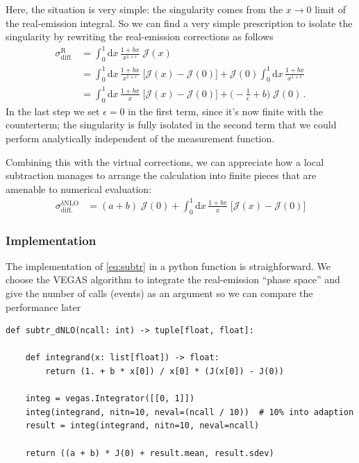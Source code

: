 \documentclass[11pt]{article}
\begin{document}
Here, the situation is very simple: the singularity comes from the \(x\to0\) limit of the real-emission integral.
So we can find a very simple prescription to isolate the singularity by rewriting the real-emission corrections as follows
\begin{align}
  \sigma^\mathrm{R}_\mathrm{diff.}
  &=
  \int_0^1\mathrm{d}x\,\frac{1+bx}{x^{1+\epsilon}}
  \;\mathcal{J}(x)
  \nonumber\\&=
  \int_0^1\mathrm{d}x\,\frac{1+bx}{x^{1+\epsilon}}
  \;\Big[\mathcal{J}(x) - \mathcal{J}(0)\Bigr]
  + \mathcal{J}(0)
  \int_0^1\mathrm{d}x\,\frac{1+bx}{x^{1+\epsilon}}
  \nonumber\\&=
  \int_0^1\mathrm{d}x\,\frac{1+bx}{x}
  \;\Big[\mathcal{J}(x) - \mathcal{J}(0)\bigr]
  +\biggl( -\frac{1}{\epsilon} + b \biggr) \;\mathcal{J}(0)
  \,.
\end{align}
In the last step we set \(\epsilon=0\) in the first term, since it's now finite with the counterterm; the singularity is fully isolated in the second term that we could perform analytically independent of the measurement function.

Combining this with the virtual corrections, we can appreciate how a local subtraction manages to arrange the calculation into finite pieces that are amenable to numerical evaluation:
\begin{align}
\label{eq:subtr}
  \sigma^\mathrm{\delta NLO}_\mathrm{diff.}
  &=
  (a + b) \;\mathcal{J}(0)
  +\int_0^1\mathrm{d}x\,\frac{1+bx}{x}
  \;\Big[\mathcal{J}(x) - \mathcal{J}(0)\Bigr]
\end{align}
\subsubsection{Implementation}
\label{sec:orgacad494}
The implementation of \eqref{eq:subtr} in a python function is straighforward.
We choose the VEGAS algorithm to integrate the real-emission ``phase space'' and give the number of calls (events) as an argument so we can compare the performance later
\begin{verbatim}
def subtr_dNLO(ncall: int) -> tuple[float, float]:

    def integrand(x: list[float]) -> float:
        return (1. + b * x[0]) / x[0] * (J(x[0]) - J(0))

    integ = vegas.Integrator([[0, 1]])
    integ(integrand, nitn=10, neval=(ncall / 10))  # 10% into adaption
    result = integ(integrand, nitn=10, neval=ncall)

    return ((a + b) * J(0) + result.mean, result.sdev)
\end{verbatim}
\end{document}
